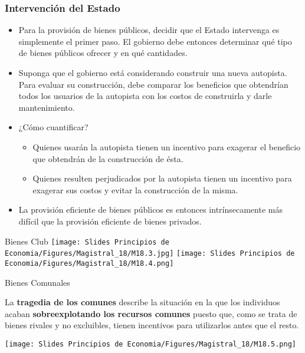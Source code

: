 \documentclass{beamer}
\begin{document}
\begin{frame}
\frametitle{Intervención del Estado}
\begin{itemize}
\item Para la provisión de bienes públicos, decidir que el Estado intervenga es simplemente el primer paso. El gobierno debe entonces determinar qué tipo de bienes públicos ofrecer y en qué cantidades.
\item  Suponga que el gobierno está considerando construir una nueva autopista. Para evaluar su construcción, debe comparar los beneficios que obtendrían todos los usuarios de la autopista con los costos de construirla y darle mantenimiento. 
\item ¿Cómo cuantificar?
    \begin{itemize}
    \item Quienes usarán la autopista tienen un incentivo para exagerar el beneficio que obtendrán de la construcción de ésta.
    \item Quienes resulten perjudicados por la autopista tienen un incentivo para exagerar sus costos y evitar la construcción de la misma.
    \end{itemize}
\item La provisión eficiente de bienes públicos es entonces intrínsecamente más difícil que la provisión eficiente de bienes privados. 
\end{itemize}
\end{frame}

\begin{frame}{Bienes Club}
    \centering
    \texttt{[image: Slides Principios de Economia/Figures/Magistral\_18/M18.3.jpg]}
    \hspace{15mm}
    \texttt{[image: Slides Principios de Economia/Figures/Magistral\_18/M18.4.png]}
\end{frame}

\begin{frame}{Bienes Comunales}
    \begin{boxB}
        \centering
        La \textbf{tragedia de los comunes} describe la situación en la que los individuos acaban \textbf{sobreexplotando los recursos comunes} puesto que, como se trata de bienes rivales y no excluibles, tienen incentivos para utilizarlos antes que el resto.
    \end{boxB}
    \vspace{5mm}
    \centering
    \texttt{[image: Slides Principios de Economia/Figures/Magistral\_18/M18.5.png]}
\end{frame}
\end{document}
